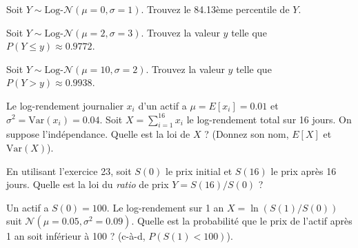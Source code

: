 \begin{exercicebox}
Soit $Y \sim \text{Log-}\mathcal{N}(\mu=0, \sigma=1)$. Trouvez le 84.13ème percentile de $Y$.
\end{exercicebox}

\begin{exercicebox}
Soit $Y \sim \text{Log-}\mathcal{N}(\mu=2, \sigma=3)$. Trouvez la valeur $y$ telle que $P(Y \le y) \approx 0.9772$.
\end{exercicebox}

\begin{exercicebox}
Soit $Y \sim \text{Log-}\mathcal{N}(\mu=10, \sigma=2)$. Trouvez la valeur $y$ telle que $P(Y > y) \approx 0.9938$.
\end{exercicebox}


\begin{exercicebox}
Le log-rendement journalier $x_i$ d'un actif a $\mu=E[x_i]=0.01$ et $\sigma^2=\text{Var}(x_i)=0.04$.
Soit $X = \sum_{i=1}^{16} x_i$ le log-rendement total sur 16 jours. On suppose l'indépendance.
Quelle est la loi de $X$ ? (Donnez son nom, $E[X]$ et $\text{Var}(X)$).
\end{exercicebox}

\begin{exercicebox}
En utilisant l'exercice 23, soit $S(0)$ le prix initial et $S(16)$ le prix après 16 jours.
Quelle est la loi du \textit{ratio} de prix $Y = S(16)/S(0)$ ?
\end{exercicebox}

\begin{exercicebox}
Un actif a $S(0)=100$. Le log-rendement sur 1 an $X = \ln(S(1)/S(0))$ suit $\mathcal{N}(\mu=0.05, \sigma^2=0.09)$.
Quelle est la probabilité que le prix de l'actif après 1 an soit inférieur à 100 ? (c-à-d, $P(S(1) < 100)$).
\end{exercicebox}